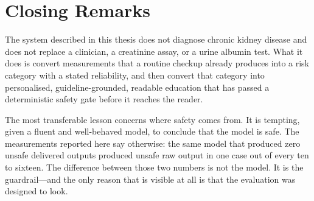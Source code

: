 \section{Closing Remarks}
\label{sec:closing}

The system described in this thesis does not diagnose chronic kidney disease and
does not replace a clinician, a creatinine assay, or a urine albumin test. What
it does is convert measurements that a routine checkup already produces into a
risk category with a stated reliability, and then convert that category into
personalised, guideline-grounded, readable education that has passed a
deterministic safety gate before it reaches the reader.

The most transferable lesson concerns where safety comes from. It is tempting,
given a fluent and well-behaved model, to conclude that the model is safe. The
measurements reported here say otherwise: the same model that produced zero
unsafe delivered outputs produced unsafe raw output in one case out of every ten
to sixteen. The difference between those two numbers is not the model. It is the
guardrail---and the only reason that is visible at all is that the evaluation was
designed to look.
